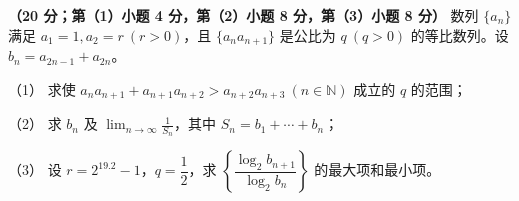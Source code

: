 \begin{question}
\textbf{（20 分；第（1）小题 4 分，第（2）小题 8 分，第（3）小题 8 分）} 数列 \(\{a_n\}\) 满足 \(a_1=1,a_2=r\ (r>0)\)，且 \(\{a_na_{n+1}\}\) 是公比为 \(q\ (q>0)\) 的等比数列。设 \(b_n=a_{2n-1}+a_{2n}\)。

（1） 求使 \(a_na_{n+1}+a_{n+1}a_{n+2}>a_{n+2}a_{n+3}\ (n\in\mathbb N)\) 成立的 \(q\) 的范围；

（2） 求 \(b_n\) 及 \(\displaystyle\lim_{n\to\infty}\frac1{S_n}\)，其中 \(S_n=b_1+\cdots+b_n\)；

（3） 设 \(r=2^{19.2}-1\)，\(q=\dfrac12\)，求 \(\left\{\dfrac{\log_2b_{n+1}}{\log_2b_n}\right\}\) 的最大项和最小项。

\end{question}